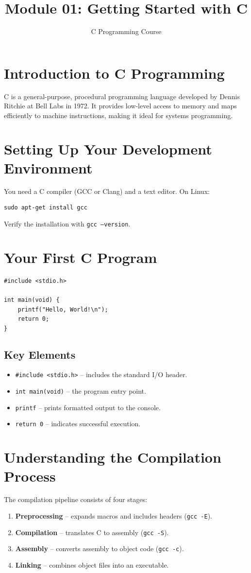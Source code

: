 \documentclass[11pt,a4paper]{article}
\title{Module 01: Getting Started with C}
\author{C Programming Course}
\date{}
\begin{document}
\maketitle
\thispagestyle{fancy}

\section{Introduction to C Programming}
C is a general-purpose, procedural programming language developed by Dennis Ritchie
at Bell Labs in 1972. It provides low-level access to memory and maps efficiently to
machine instructions, making it ideal for systems programming.

\section{Setting Up Your Development Environment}
You need a C compiler (GCC or Clang) and a text editor. On Linux:
\begin{verbatim}
sudo apt-get install gcc
\end{verbatim}
Verify the installation with \texttt{gcc --version}.

\section{Your First C Program}
\begin{lstlisting}
#include <stdio.h>

int main(void) {
    printf("Hello, World!\n");
    return 0;
}
\end{lstlisting}

\subsection{Key Elements}
\begin{itemize}
  \item \texttt{\#include <stdio.h>} -- includes the standard I/O header.
  \item \texttt{int main(void)} -- the program entry point.
  \item \texttt{printf} -- prints formatted output to the console.
  \item \texttt{return 0} -- indicates successful execution.
\end{itemize}

\section{Understanding the Compilation Process}
The compilation pipeline consists of four stages:
\begin{enumerate}
  \item \textbf{Preprocessing} -- expands macros and includes headers (\texttt{gcc -E}).
  \item \textbf{Compilation} -- translates C to assembly (\texttt{gcc -S}).
  \item \textbf{Assembly} -- converts assembly to object code (\texttt{gcc -c}).
  \item \textbf{Linking} -- combines object files into an executable.
\end{enumerate}
\end{document}
